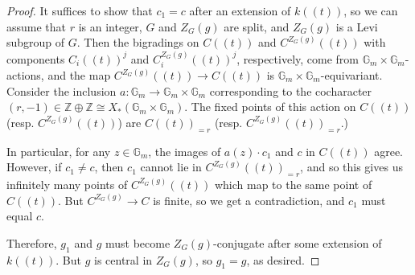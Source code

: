 \documentclass[10pt,a4paper]{amsart}
\begin{document}
\begin{proof}
It suffices to show that $c_1=c$ after an extension of $k((t))$, so we can assume that $r$ is an integer, $G$ and $Z_G(g)$ are split, and $Z_G(g)$ is a Levi subgroup of $G$. Then the bigradings on $C((t))$ and $C^{Z_G(g)}((t))$ with components $C_i((t))^j$ and $C^{Z_G(g)}_i((t))^j$, respectively, come from $\mathbb{G}_m\times\mathbb{G}_m$-actions, and the map $C^{Z_G(g)}((t))\rightarrow C((t))$ is $\mathbb{G}_m\times\mathbb{G}_m$-equivariant. Consider the inclusion $a:\mathbb{G}_m\rightarrow\mathbb{G}_m\times\mathbb{G}_m$ corresponding to the cocharacter $(r,-1)\in\mathbb{Z}\oplus\mathbb{Z}\cong X_*(\mathbb{G}_m\times\mathbb{G}_m).$ The fixed points of this action on $C((t))$ (resp. $C^{Z_G(g)}((t))$) are $C((t))_{=r}$ (resp. $C^{Z_G(g)}((t))_{=r}$.)

In particular, for any $z\in\mathbb{G}_m$, the images of $a(z)\cdot c_1$ and $c$ in $C((t))$ agree. However, if $c_1\neq c$, then $c_1$ cannot lie in $C^{Z_G(g)}((t))_{=r}$, and so this gives us infinitely many points of $C^{Z_G(g)}((t))$ which map to the same point of $C((t))$. But $C^{Z_G(g)}\rightarrow C$ is finite, so we get a contradiction, and $c_1$ must equal $c$.

Therefore, $g_1$ and $g$ must become $Z_G(g)$-conjugate after some extension of $k((t))$. But $g$ is central in $Z_G(g)$, so $g_1=g$, as desired.

\end{proof}
\end{document}
